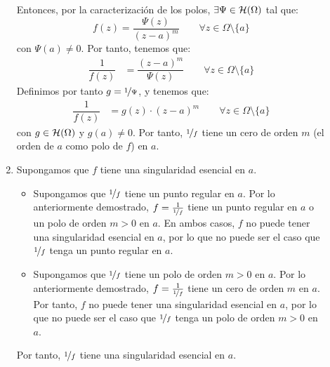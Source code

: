 \begin{ejercicio}
\begin{description}
\begin{enumerate}
            Entonces, por la caracterización de los polos, $\exists \Psi \in \mathcal{H}(\Omega)$ tal que:
            \begin{equation*}
                f(z) = \dfrac{\Psi(z)}{(z - a)^m}\qquad \forall z \in \Omega \setminus \{a\}
            \end{equation*}
            con $\Psi(a) \neq 0$. Por tanto, tenemos que:
            \begin{align*}
                \dfrac{1}{f(z)} &= \dfrac{(z - a)^m}{\Psi(z)}\qquad \forall z \in \Omega \setminus \{a\}
            \end{align*}
            Definimos por tanto $g=\nicefrac{1}{\Psi}$, y tenemos que:
            \begin{align*}
                \dfrac{1}{f(z)} &= g(z) \cdot (z - a)^m\qquad \forall z \in \Omega \setminus \{a\}
            \end{align*}
            con $g \in \mathcal{H}(\Omega)$ y $g(a) \neq 0$. Por tanto, $\nicefrac{1}{f}$ tiene un cero de orden $m$ (el orden de $a$ como polo de $f$) en $a$.


            \item Supongamos que $f$ tiene una singularidad esencial en $a$.
            \begin{itemize}
                \item Supongamos que $\nicefrac{1}{f}$ tiene un punto regular en $a$. Por lo anteriormente demostrado, $f=\frac{1}{\nicefrac{1}{f}}$ tiene un punto regular en $a$ o un polo de orden $m > 0$ en $a$. En ambos casos, $f$ no puede tener una singularidad esencial en $a$, por lo que no puede ser el caso que $\nicefrac{1}{f}$ tenga un punto regular en $a$.
                
                \item Supongamos que $\nicefrac{1}{f}$ tiene un polo de orden $m > 0$ en $a$. Por lo anteriormente demostrado, $f=\frac{1}{\nicefrac{1}{f}}$ tiene un cero de orden $m$ en $a$. Por tanto, $f$ no puede tener una singularidad esencial en $a$, por lo que no puede ser el caso que $\nicefrac{1}{f}$ tenga un polo de orden $m > 0$ en $a$.
            \end{itemize}

            Por tanto, $\nicefrac{1}{f}$ tiene una singularidad esencial en $a$.
        \end{enumerate}
    \end{description}
\end{ejercicio}

